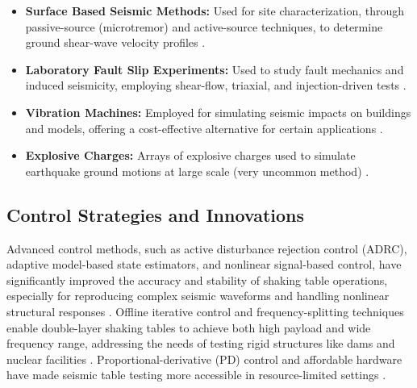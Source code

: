 \documentclass[9pt]{extarticle}
\begin{document}
\begin{itemize}
    \item \textbf{Surface Based Seismic Methods:} Used for site characterization, through passive-source (microtremor) and active-source techniques, to determine ground shear-wave velocity profiles \citep{Luke2008Characterizing}.
    
    \item \textbf{Laboratory Fault Slip Experiments:} Used to study fault mechanics and induced seismicity, employing shear-flow, triaxial, and injection-driven tests \citep{Ji2022Laboratory,Dong2022Investigations}.
    
    \item \textbf{Vibration Machines:} Employed for simulating seismic impacts on buildings and models, offering a cost-effective alternative for certain applications \citep{Abovyan2024Method}.

    \item \textbf{Explosive Charges:} Arrays of explosive charges used to simulate earthquake ground motions at large scale (very uncommon method) \citep{williams2001}.
\end{itemize}



\subsection{Control Strategies and Innovations}
Advanced control methods, such as active disturbance rejection control (ADRC), adaptive model-based state estimators, and nonlinear signal-based control, have significantly improved the accuracy and stability of shaking table operations, especially for reproducing complex seismic waveforms and handling nonlinear structural responses %
. Offline iterative control and frequency-splitting techniques enable double-layer shaking tables to achieve both high payload and wide frequency range, addressing the needs of testing rigid structures like dams and nuclear facilities %
. Proportional-derivative (PD) control and affordable hardware have made seismic table testing more accessible in resource-limited settings %
.
\end{document}
